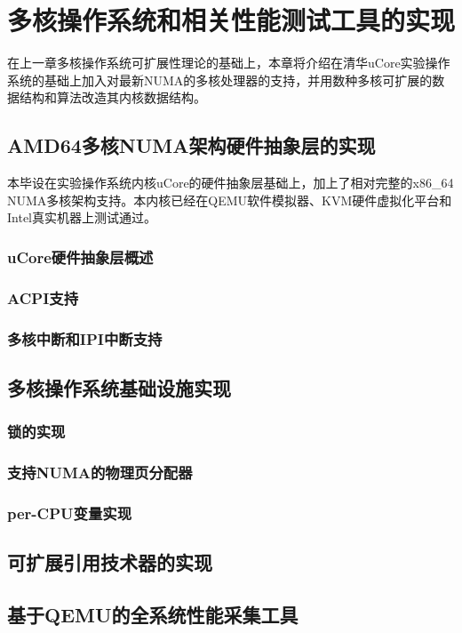 
\chapter{多核操作系统和相关性能测试工具的实现}
在上一章多核操作系统可扩展性理论的基础上，本章将介绍在清华uCore实验操作系统的基础上加入对最新NUMA的多核处理器的支持，并用数种多核可扩展的数据结构和算法改造其内核数据结构。

\section{AMD64多核NUMA架构硬件抽象层的实现}
本毕设在实验操作系统内核uCore的硬件抽象层基础上，加上了相对完整的x86\_64 NUMA多核架构支持。本内核已经在QEMU软件模拟器、KVM硬件虚拟化平台和Intel真实机器上测试通过。
\subsection{uCore硬件抽象层概述}

\subsection{ACPI支持}

\subsection{多核中断和IPI中断支持}

\section{多核操作系统基础设施实现}
\subsection{锁的实现}

\subsection{支持NUMA的物理页分配器}

\subsection{per-CPU变量实现}

\section{可扩展引用技术器的实现}

\section{基于QEMU的全系统性能采集工具}
